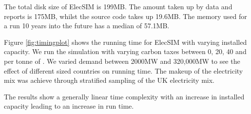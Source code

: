 The total disk size of ElecSIM is 199MB. The amount taken up by data and reports is 175MB, whilst the source code takes up 19.6MB. The memory used for a run 10 years into the future has a median of 57.1MB.


Figure \ref{fig:timingplot} shows the running time for ElecSIM with varying installed capacity. We run the simulation with varying carbon taxes between 0, 20, 40 and  per tonne of . We varied demand between 2000MW and 320,000MW to see the effect of different sized countries on running time. The makeup of the electricity mix was achieve through stratified sampling of the UK electricity mix. 

The results show a generally linear time complexity with an increase in installed capacity leading to an increase in run time.

